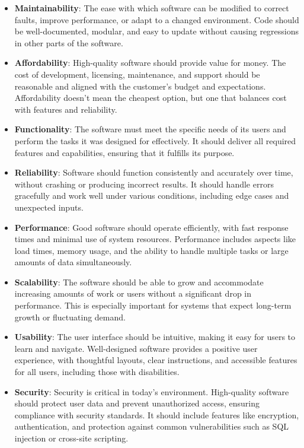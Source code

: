 \begin{itemize}

\item \textbf{Maintainability}:
The ease with which software can be modified to correct faults, improve performance, or adapt to a changed environment. Code should be well-documented, modular, and easy to update without causing regressions in other parts of the software.


\item \textbf{Affordability}:  
High-quality software should provide value for money. The cost of development, licensing, maintenance, and support should be reasonable and aligned with the customer's budget and expectations. Affordability doesn't mean the cheapest option, but one that balances cost with features and reliability.

\item \textbf{Functionality}:  
The software must meet the specific needs of its users and perform the tasks it was designed for effectively. It should deliver all required features and capabilities, ensuring that it fulfills its purpose.

\item \textbf{Reliability}:  
Software should function consistently and accurately over time, without crashing or producing incorrect results. It should handle errors gracefully and work well under various conditions, including edge cases and unexpected inputs.

\item \textbf{Performance}:  
Good software should operate efficiently, with fast response times and minimal use of system resources. Performance includes aspects like load times, memory usage, and the ability to handle multiple tasks or large amounts of data simultaneously.

\item \textbf{Scalability}:  
The software should be able to grow and accommodate increasing amounts of work or users without a significant drop in performance. This is especially important for systems that expect long-term growth or fluctuating demand.

\item \textbf{Usability}:  
The user interface should be intuitive, making it easy for users to learn and navigate. Well-designed software provides a positive user experience, with thoughtful layouts, clear instructions, and accessible features for all users, including those with disabilities.

\item \textbf{Security}:  
Security is critical in today's environment. High-quality software should protect user data and prevent unauthorized access, ensuring compliance with security standards. It should include features like encryption, authentication, and protection against common vulnerabilities such as SQL injection or cross-site scripting.


\end{itemize}
